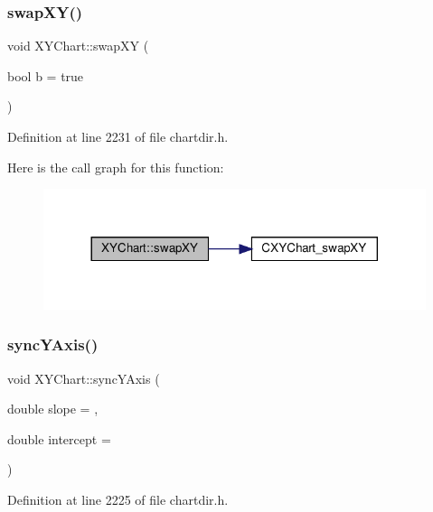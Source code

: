 \subsubsection{\texorpdfstring{swap\+X\+Y()}{swapXY()}}
{\footnotesize\ttfamily void X\+Y\+Chart\+::swap\+XY (\begin{DoxyParamCaption}\item[{bool}]{b = {\ttfamily true} }\end{DoxyParamCaption})\hspace{0.3cm}{\ttfamily [inline]}}



Definition at line 2231 of file chartdir.\+h.

Here is the call graph for this function\+:
\nopagebreak
\begin{figure}[H]
\begin{center}
\leavevmode
\includegraphics[width=317pt]{class_x_y_chart_a91e9233dd2a3a76c44a87e7ecc0ade2f_cgraph}
\end{center}
\end{figure}
\mbox{\label{class_x_y_chart_a0d45ea4e19b8b60d93ca36b1f4f8f3fd}} 
\subsubsection{\texorpdfstring{sync\+Y\+Axis()}{syncYAxis()}}
{\footnotesize\ttfamily void X\+Y\+Chart\+::sync\+Y\+Axis (\begin{DoxyParamCaption}\item[{double}]{slope = {},  }\item[{double}]{intercept = {} }\end{DoxyParamCaption})\hspace{0.3cm}{\ttfamily [inline]}}



Definition at line 2225 of file chartdir.\+h.

